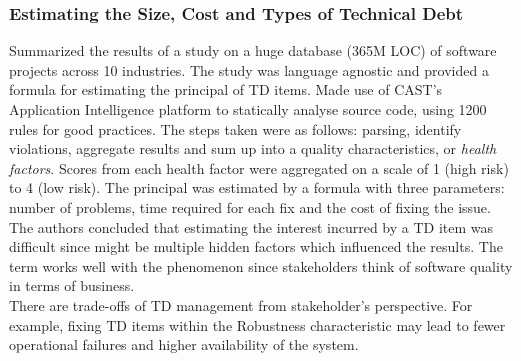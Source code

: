 \documentclass{mprop}
\begin{document}
\subsubsection{Estimating the Size, Cost and Types of Technical Debt} \cite{Curtis2012}
Summarized the results of a study on a huge database (365M LOC) of software projects across 10 industries.
The study was language agnostic and provided a formula for estimating the principal of TD items.
Made use of CAST's Application Intelligence platform to statically analyse source code, using 1200 rules for good practices.
The steps taken were as follows: parsing, identify violations, aggregate results and sum up into a quality characteristics, or \textit{health factors}.
Scores from each health factor were aggregated on a scale of 1 (high risk) to 4 (low risk).
The principal was estimated by a formula with three parameters: number of problems, time required for each fix and the cost of fixing the issue.
The authors concluded that estimating the interest incurred by a TD item was difficult since might be multiple hidden factors which influenced the results.
The term works well with the phenomenon since stakeholders think of software quality in terms of business. \\
There are trade-offs of TD management from stakeholder's perspective.
For example, fixing TD items within the Robustness characteristic may lead to fewer operational failures and higher availability of the system.
\end{document}
